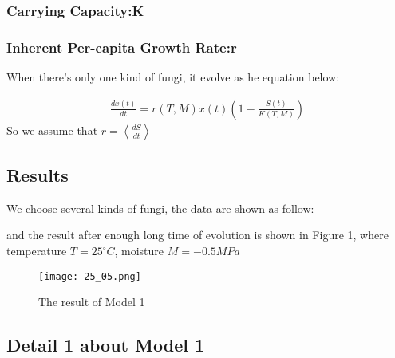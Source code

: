 			\subsubsection{Carrying Capacity:K}
			\subsubsection{Inherent Per-capita Growth Rate:r}
            When there's only one kind of fungi, it evolve as he equation below:

            \begin{align}
                \frac{dx(t)}{dt}=r(T,M)x(t)(1-\frac{S(t)}{K(T,M)})
            \end{align}
            So we assume that $r=\left< \frac{dS}{dt} \right>$
		\subsection{Results}
        We choose several kinds of fungi, the data are shown as follow:

and the result after enough long time of evolution is shown in Figure 1, where temperature $T=25^{\circ}C$, moisture $M=-0.5MPa$

\begin{figure}[H]
    \centering
    \texttt{[image: 25\_05.png]}
    \caption{The result of Model 1}\label{fig:result1}%
    \end{figure}

	\subsection{Detail 1 about Model 1}








